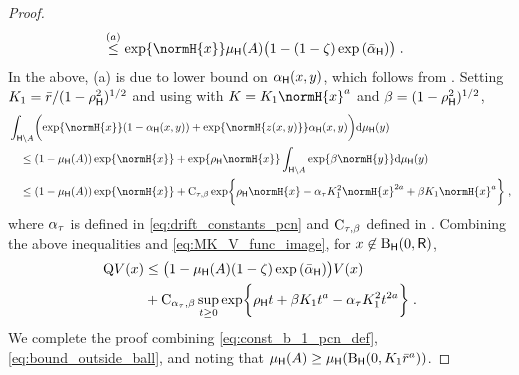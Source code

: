 \begin{proof}
\begin{align*}
&\overset{(a)}{\leq}  \exp\{\normH{x}\}\muH(\eventA)\bigl(1 - (1 - \smallconst)\exp\left(\alphalpCN\right)\bigr)\eqsp.
\end{align*}
In the above, (a) is due to lower bound on $\alpha_{\mathsf{H}}(x,y)$, which follows from . Setting $K_1 = \bar{r}/(1-\rho_{\mathsf{H}}^2)^{1/2}$ and using  with $K = \constKone \normH{x}^a$ and $\beta = (1-\rho_{\mathsf{H}}^2)^{1/2}$,
\begin{align*}
& \int_{\msh\setminus\eventA}\biggl(\exp\{\normH{x}\}(1-\alphaH(x,y)) + \exp\{\normH{\prop(x,y)}\}\alphaH(x,y)\biggr)\rmd \muH(y) \\
& \quad \leq (1 - \muH(\eventA))\exp\{\normH{x}\} + \exp\{\rhoH\normH{x}\}\int_{\msh\setminus\eventA}\exp\{\betagaus\normH{y}\} \rmd \muH(y) \\
& \quad \leq (1 - \muH(\eventA))\exp\{\normH{x}\} + \ConstC_{\tau,\betagaus}\exp\biggl\{\rhoH\normH{x} - \alphagaus \constKone^2 \normH{x}^{2a} + \betagaus \constKone \normH{x}^a\biggr\}\eqsp,
\end{align*}
where $\alpha_{\tau}$ is defined in \eqref{eq:drift_constants_pcn} and $\operatorname{C}_{\tau,\beta}$ defined in . Combining the above inequalities and \eqref{eq:MK_V_func_image}, for $x \not\in \operatorname{B}_{\mathsf{H}}(0,\mathsf{R})$,
\begin{equation}
 \label{eq:bound_outside_ball}
 \begin{split}
{\rm Q} V(x) &\leq \bigl(1 - \mu_{\mathsf{H}}(A)(1-\zeta)\exp\left(\bar{\alpha}_{\mathsf{H}}\right)\bigr)V(x) \\
&+ \operatorname{C}_{\alpha_{\tau},\beta}\sup_{t \geq 0}\exp\biggl\{\rho_{\mathsf{H}} t + \beta K_1 t^{a} - \alpha_{\tau} K_1^2 t^{2a}\biggr\}\;.
 \end{split}
\end{equation}
We complete the proof combining \eqref{eq:const_b_1_pcn_def}, \eqref{eq:bound_outside_ball}, and noting that $\mu_{\mathsf{H}}(A) \geq \mu_{\mathsf{H}}(\operatorname{B}_{\mathsf{H}}(0,K_1 \bar{r}^{a}))$.
\end{proof}



